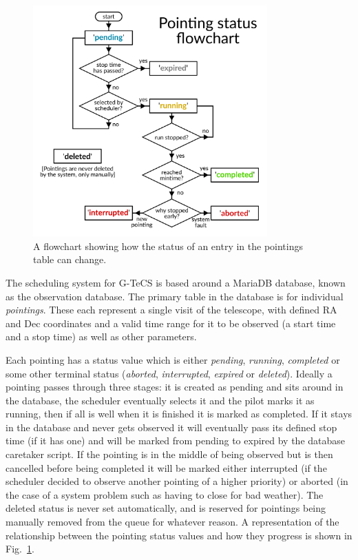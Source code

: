 \begin{colsection}
\begin{colsection}
\begin{figure}[ht]
\begin{center}
\includegraphics[width=9cm]{images/pointings.pdf}
\end{center}
\caption[Pointings]{A flowchart showing how the status of an entry in the pointings table can change.}
\label{fig:pointings}
\end{figure}

The scheduling system for \textsf{G-TeCS} is based around a MariaDB database, known as the observation database. The primary table in the database is for individual \textit{pointings}. These each represent a single visit of the telescope, with defined RA and Dec coordinates and a valid time range for it to be observed (a start time and a stop time) as well as other parameters.

Each pointing has a status value which is either \textit{pending}, \textit{running}, \textit{completed} or some other terminal status (\textit{aborted}, \textit{interrupted}, \textit{expired} or \textit{deleted}). Ideally a pointing passes through three stages: it is created as pending and sits around in the database, the scheduler eventually selects it and the pilot marks it as running, then if all is well when it is finished it is marked as completed. If it stays in the database and never gets observed it will eventually pass its defined stop time (if it has one) and will be marked from pending to expired by the database caretaker script. If the pointing is in the middle of being observed but is then cancelled before being completed it will be marked either interrupted (if the scheduler decided to observe another pointing of a higher priority) or aborted (in the case of a system problem such as having to close for bad weather). The deleted status is never set automatically, and is reserved for pointings being manually removed from the queue for whatever reason. A representation of the relationship between the pointing status values and how they progress is shown in Fig.~\ref{fig:pointings}.


\end{colsection}
\end{colsection}
